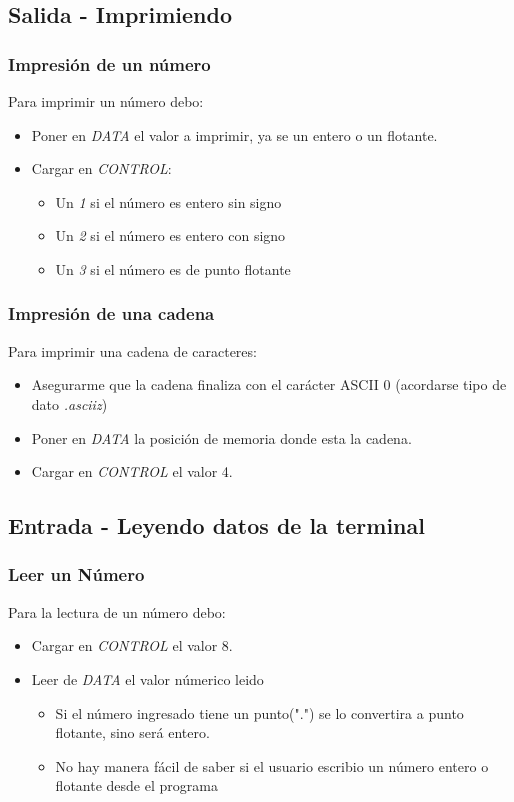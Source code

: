 \documentclass{beamer}
\begin{document}
\subsection{Salida - Imprimiendo}
\begin{frame}
\frametitle{Impresión de un número}
Para imprimir un número debo:
\begin{itemize}
\item Poner en \emph{DATA} el valor a imprimir, ya se un entero o un flotante.
\item Cargar en \emph{CONTROL}:
\begin{itemize}
\item Un \emph{1} si el número es entero sin signo
\item Un \emph{2} si el número es entero con signo
\item Un \emph{3} si el número es de punto flotante
\end{itemize}

\end{itemize}
\end{frame}

\begin{frame}
\frametitle{Impresión de una cadena}
Para imprimir una cadena de caracteres:
\begin{itemize}
\item Asegurarme que la cadena finaliza con el carácter ASCII 0 (acordarse tipo de dato \emph{.asciiz})
\item Poner en \emph{DATA} la posición de memoria donde esta la cadena.
\item Cargar en \emph{CONTROL} el valor 4.
\end{itemize}
\end{frame}


\subsection{Entrada - Leyendo datos de la terminal}
\begin{frame}
\frametitle{Leer un Número}
Para la lectura de un número debo:
\begin{itemize}
\item Cargar en \emph{CONTROL} el valor 8.
\item Leer de \emph{DATA} el valor númerico leido
\begin{itemize}
\item Si el número ingresado tiene un punto(".") se lo convertira a punto flotante, sino será entero.
\item No hay manera fácil de saber si el usuario escribio un número entero o flotante desde el programa
\end{itemize}
\end{itemize}
\end{frame}
\end{document}
